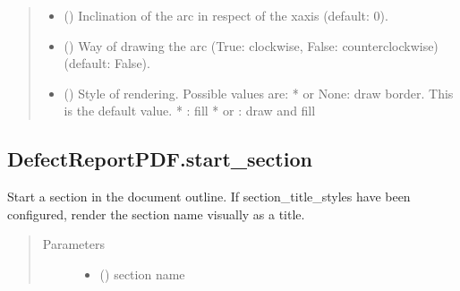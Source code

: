 \documentclass[letterpaper,10pt,english]{sphinxmanual}
\begin{document}
\begin{fulllineitems}
\begin{fulllineitems}
\begin{quote}
\begin{description}
\begin{itemize}
\item {} 
\sphinxAtStartPar
{} () \textendash{} Inclination of the arc in respect of the x\sphinxhyphen{}axis (default: 0).

\item {} 
\sphinxAtStartPar
{} () \textendash{} Way of drawing the arc (True: clockwise, False: counterclockwise) (default: False).

\item {} 
\sphinxAtStartPar
{} () \textendash{} Style of rendering. Possible values are:
*  or None: draw border. This is the default value.
* : fill
*  or : draw and fill

\end{itemize}

\end{description}\end{quote}

\end{fulllineitems}



\subsection{DefectReportPDF.start\_section}
\label{\detokenize{generated/quality_assessment.quality_pdf_report.DefectReportPDF.start_section:defectreportpdf-start-section}}\label{\detokenize{generated/quality_assessment.quality_pdf_report.DefectReportPDF.start_section::doc}}

\begin{fulllineitems}
\label{\detokenize{generated/quality_assessment.quality_pdf_report.DefectReportPDF.start_section:quality_assessment.quality_pdf_report.DefectReportPDF.start_section}}
\sphinxAtStartPar
Start a section in the document outline.
If section\_title\_styles have been configured,
render the section name visually as a title.
\begin{quote}\begin{description}
\item[{Parameters}] \leavevmode\begin{itemize}
\item {} 
\sphinxAtStartPar
{} () \textendash{} section name


\end{itemize}
\end{description}
\end{quote}
\end{fulllineitems}
\end{fulllineitems}
\end{document}
